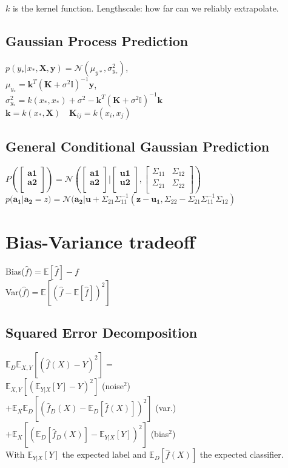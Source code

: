 $k$ is the kernel function. Lengthscale: how far can we reliably extrapolate.
\subsection*{Gaussian Process Prediction}
$p(y_*|x_*,\mathbf{X},\mathbf{y}) = \mathcal{N}(\mu_{y*},\sigma^2_{y_*})$,\\
$\mu_{y_*}=\mathbf{k}^T(\mathbf{K}+\sigma^2\mathbb{I})^{-1}\mathbf{y}$,\\
$\sigma^2_{y_*}=k(x_*,x_*){+}\sigma^2-\mathbf{k}^T(\mathbf{K}+\sigma^2\mathbb{I})^{-1}\mathbf{k}$\\
$\mathbf{k}=k(x_*,\mathbf{X})\quad \mathbf{K}_{ij}=k(x_i,x_j)$

\subsection*{General Conditional Gaussian Prediction}
$P(\begin{bmatrix}
\mathbf{a1}\\
\mathbf{a2}\\
\end{bmatrix}){=}\mathcal{N}(\begin{bmatrix}
\mathbf{a1}\\
\mathbf{a2}\\
\end{bmatrix}|\begin{bmatrix}
\mathbf{u1}\\
\mathbf{u2}\\
\end{bmatrix},\begin{bmatrix}
\Sigma_{11} & \Sigma_{12} \\
\Sigma_{21} & \Sigma_{22}\\
\end{bmatrix})$\\
 $p(\mathbf{a_1}|\mathbf{a_2} = z) = \mathcal{N}(\mathbf{a_2}|\mathbf{u}+\Sigma_{21} \Sigma_{11}^{-1}(\mathbf{z}-\mathbf{u_1}, \Sigma_{22}- \Sigma_{21} \Sigma_{11}^{-1} \Sigma_{12})$


\section*{Bias-Variance tradeoff}
Bias($\hat{f}$)$=\mathbb{E}[\hat{f}]-f$\\
Var($\hat{f}$)$=\mathbb{E}[(\hat{f}-\mathbb{E}[\hat{f}])^2]$
\subsection*{Squared Error Decomposition}
$\mathbb{E}_D\mathbb{E}_{X,Y}[(\hat{f}(X)-Y)^2]=$\\
$\mathbb{E}_{X,Y}[(\mathbb{E}_{Y|X}[Y]-Y)^2]$ (noise$^2$)\\
$+\mathbb{E}_X\mathbb{E}_D[(\hat{f}_D(X)-\mathbb{E}_D[\hat{f}(X)])^2]$ (var.)\\
$+\mathbb{E}_X[(\mathbb{E}_D[\hat{f}_D(X)]-\mathbb{E}_{Y|X}[Y])^2]$ (bias$^2$)\\
With $\mathbb{E}_{Y|X}[Y]$ the expected label and $\mathbb{E}_{D}[\hat{f}(X)]$ the expected classifier.